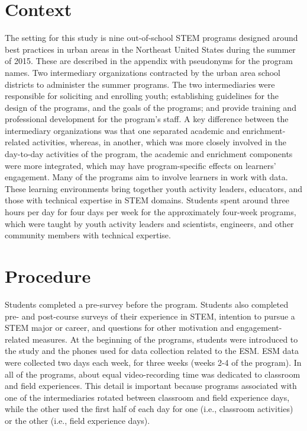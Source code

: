 \documentclass[]{msu-thesis}
\theoremstyle{definition}
\theoremstyle{definition}
\theoremstyle{definition}
\theoremstyle{remark}
\begin{document}
\section{Context}\label{context}

The setting for this study is nine out-of-school STEM programs designed
around best practices in urban areas in the Northeast United States
during the summer of 2015. These are described in the appendix with
pseudonyms for the program names. Two intermediary organizations
contracted by the urban area school districts to administer the summer
programs. The two intermediaries were responsible for soliciting and
enrolling youth; establishing guidelines for the design of the programs,
and the goals of the programs; and provide training and professional
development for the program's staff. A key difference between the
intermediary organizations was that one separated academic and
enrichment-related activities, whereas, in another, which was more
closely involved in the day-to-day activities of the program, the
academic and enrichment components were more integrated, which may have
program-specific effects on learners' engagement. Many of the programs
aim to involve learners in work with data. These learning environments
bring together youth activity leaders, educators, and those with
technical expertise in STEM domains. Students spent around three hours
per day for four days per week for the approximately four-week programs,
which were taught by youth activity leaders and scientists, engineers,
and other community members with technical expertise.

\section{Procedure}\label{procedure}

Students completed a pre-survey before the program. Students also
completed pre- and post-course surveys of their experience in STEM,
intention to pursue a STEM major or career, and questions for other
motivation and engagement-related measures. At the beginning of the
programs, students were introduced to the study and the phones used for
data collection related to the ESM. ESM data were collected two days
each week, for three weeks (weeks 2-4 of the program). In all of the
programs, about equal video-recording time was dedicated to classroom
and field experiences. This detail is important because programs
associated with one of the intermediaries rotated between classroom and
field experience days, while the other used the first half of each day
for one (i.e., classroom activities) or the other (i.e., field
experience days).
\end{document}
